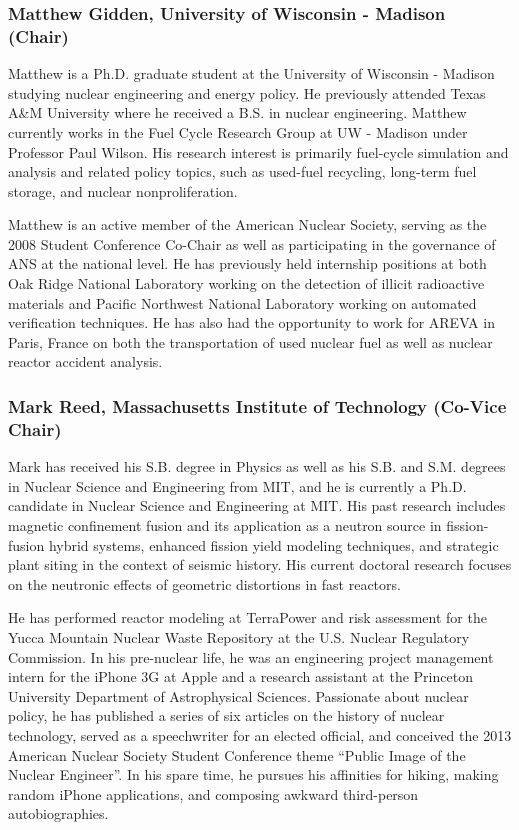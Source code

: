 \subsubsection*{Matthew Gidden, University of Wisconsin - Madison (Chair)}

Matthew is a Ph.D. graduate student at the University of Wisconsin - Madison
studying nuclear engineering and energy policy. He previously attended Texas
A\&M University where he received a B.S. in nuclear engineering. Matthew
currently works in the Fuel Cycle Research Group at UW - Madison under Professor
Paul Wilson. His research interest is primarily fuel-cycle simulation and
analysis and related policy topics, such as used-fuel recycling, long-term fuel
storage, and nuclear nonproliferation.

Matthew is an active member of the American Nuclear Society, serving as the 2008
Student Conference Co-Chair as well as participating in the governance of ANS at
the national level. He has previously held internship positions at both Oak
Ridge National Laboratory working on the detection of illicit radioactive
materials and Pacific Northwest National Laboratory working on automated
verification techniques. He has also had the opportunity to work for AREVA in
Paris, France on both the transportation of used nuclear fuel as well as nuclear
reactor accident analysis.

\subsubsection*{Mark Reed, Massachusetts Institute of Technology (Co-Vice Chair)}

Mark has received his S.B. degree in Physics as well as his S.B. and
S.M. degrees in Nuclear Science and Engineering from MIT, and he is currently a
Ph.D. candidate in Nuclear Science and Engineering at MIT. His past research
includes magnetic confinement fusion and its application as a neutron source in
fission-fusion hybrid systems, enhanced fission yield modeling techniques, and
strategic plant siting in the context of seismic history. His current doctoral
research focuses on the neutronic effects of geometric distortions in fast
reactors.

He has performed reactor modeling at TerraPower and risk assessment for the
Yucca Mountain Nuclear Waste Repository at the U.S. Nuclear Regulatory
Commission. In his pre-nuclear life, he was an engineering project management
intern for the iPhone 3G at Apple and a research assistant at the Princeton
University Department of Astrophysical Sciences. Passionate about nuclear
policy, he has published a series of six articles on the history of nuclear
technology, served as a speechwriter for an elected official, and conceived the
2013 American Nuclear Society Student Conference theme ``Public Image of the
Nuclear Engineer''. In his spare time, he pursues his affinities for hiking,
making random iPhone applications, and composing awkward third-person
autobiographies.

